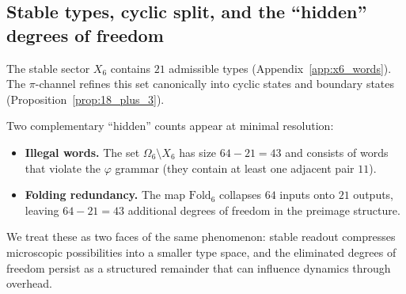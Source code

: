 \subsection{Stable types, cyclic split, and the ``hidden'' degrees of freedom}
\label{subsec:ghost_microstates_bridge}

The stable sector $X_6$ contains $21$ admissible types (Appendix~\ref{app:x6_words}).
The $\pi$-channel refines this set canonically into cyclic states and boundary states (Proposition~\ref{prop:18_plus_3}).

Two complementary ``hidden'' counts appear at minimal resolution:
\begin{itemize}
\item \textbf{Illegal words.} The set $\Omega_6\setminus X_6$ has size $64-21=43$ and consists of words that violate the $\varphi$ grammar (they contain at least one adjacent pair $11$).
\item \textbf{Folding redundancy.} The map $\mathrm{Fold}_6$ collapses $64$ inputs onto $21$ outputs, leaving $64-21=43$ additional degrees of freedom in the preimage structure.
\end{itemize}
We treat these as two faces of the same phenomenon: stable readout compresses microscopic possibilities into a smaller type space, and the eliminated degrees of freedom persist as a structured remainder that can influence dynamics through overhead.



